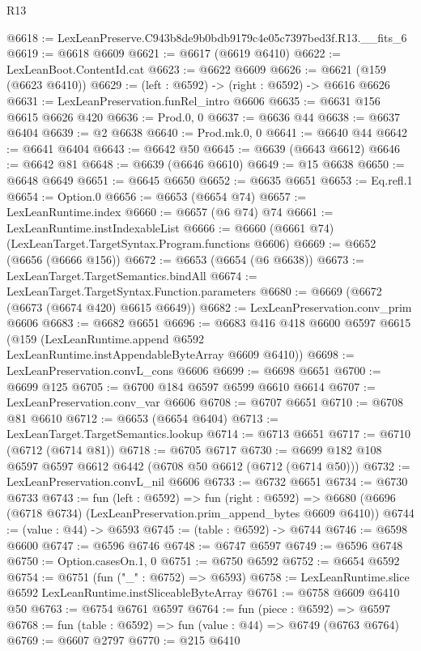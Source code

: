 \begin{lexlean}{R13}
\begin{coremodule}
@6618 := LexLeanPreserve.C943b8de9b0bdb9179c4e05c7397bed3f.R13.__fits_6
@6619 := @6618 @6609
@6621 := @6617 (@6619 @6410)
@6622 := LexLeanBoot.ContentId.cat
@6623 := @6622 @6609
@6626 := @6621 (@159 (@6623 @6410))
@6629 := (left : @6592) -> (right : @6592) -> @6616 @6626
@6631 := LexLeanPreservation.funRel_intro @6606
@6635 := @6631 @156 @6615 @6626 @420
@6636 := Prod.{0, 0}
@6637 := @6636 @44
@6638 := @6637 @6404
@6639 := @2 @6638
@6640 := Prod.mk.{0, 0}
@6641 := @6640 @44
@6642 := @6641 @6404
@6643 := @6642 @50
@6645 := @6639 (@6643 @6612)
@6646 := @6642 @81
@6648 := @6639 (@6646 @6610)
@6649 := @15 @6638
@6650 := @6648 @6649
@6651 := @6645 @6650
@6652 := @6635 @6651
@6653 := Eq.refl.{1}
@6654 := Option.{0}
@6656 := @6653 (@6654 @74)
@6657 := LexLeanRuntime.index
@6660 := @6657 (@6 @74) @74
@6661 := LexLeanRuntime.instIndexableList
@6666 := @6660 (@6661 @74) (LexLeanTarget.TargetSyntax.Program.functions @6606)
@6669 := @6652 (@6656 (@6666 @156))
@6672 := @6653 (@6654 (@6 @6638))
@6673 := LexLeanTarget.TargetSemantics.bindAll
@6674 := LexLeanTarget.TargetSyntax.Function.parameters
@6680 := @6669 (@6672 (@6673 (@6674 @420) @6615 @6649))
@6682 := LexLeanPreservation.conv_prim @6606
@6683 := @6682 @6651
@6696 := @6683
    @416
    @418
    @6600
    @6597
    @6615
    (@159 (LexLeanRuntime.append @6592 LexLeanRuntime.instAppendableByteArray @6609 @6410))
@6698 := LexLeanPreservation.convL_cons @6606
@6699 := @6698 @6651
@6700 := @6699 @125
@6705 := @6700 @184 @6597 @6599 @6610 @6614
@6707 := LexLeanPreservation.conv_var @6606
@6708 := @6707 @6651
@6710 := @6708 @81 @6610
@6712 := @6653 (@6654 @6404)
@6713 := LexLeanTarget.TargetSemantics.lookup
@6714 := @6713 @6651
@6717 := @6710 (@6712 (@6714 @81))
@6718 := @6705 @6717
@6730 := @6699 @182 @108 @6597 @6597 @6612 @6442 (@6708 @50 @6612 (@6712 (@6714 @50)))
@6732 := LexLeanPreservation.convL_nil @6606
@6733 := @6732 @6651
@6734 := @6730 @6733
@6743 := fun (left : @6592) =>
  fun (right : @6592) =>
  @6680 (@6696 (@6718 @6734) (LexLeanPreservation.prim_append_bytes @6609 @6410))
@6744 := (value : @44) -> @6593
@6745 := (table : @6592) -> @6744
@6746 := @6598 @6600
@6747 := @6596 @6746
@6748 := @6747 @6597
@6749 := @6596 @6748
@6750 := Option.casesOn.{1, 0}
@6751 := @6750 @6592
@6752 := @6654 @6592
@6754 := @6751 (fun ("_" : @6752) => @6593)
@6758 := LexLeanRuntime.slice @6592 LexLeanRuntime.instSliceableByteArray
@6761 := @6758 @6609 @6410 @50
@6763 := @6754 @6761 @6597
@6764 := fun (piece : @6592) => @6597
@6768 := fun (table : @6592) => fun (value : @44) => @6749 (@6763 @6764)
@6769 := @6607 @2797
@6770 := @215 @6410

\end{coremodule}
\end{lexlean}
